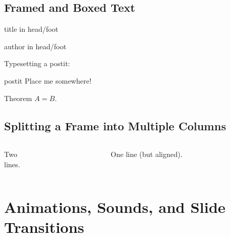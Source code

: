   \subsection{Framed and Boxed Text}
  \begin{frame}
  \begin{beamercolorbox}[ht=2.5ex,dp=1ex,center]{title in head/foot}
  \insertshorttitle
  \end{beamercolorbox}%
  \begin{beamercolorbox}[ht=2.5ex,dp=1ex,center]{author in head/foot}
  \insertshortauthor
  \end{beamercolorbox}
  \mbox{}\medskip\newline
  Typesetting a postit:\newline
  \begin{beamercolorbox}[sep=1em,wd=5cm]{postit}
  Place me somewhere!
  \end{beamercolorbox}
  \mbox{}\medskip\newline
  \begin{beamerboxesrounded}[upper=block head,lower=block body,shadow=true]{Theorem}
  $A = B$.
  \end{beamerboxesrounded}
  \end{frame}
  \subsection{Splitting a Frame into Multiple Columns}
  \begin{frame}
  \begin{columns}[t]
  \begin{column}{5cm}
  Two\\lines.
  \end{column}
  \begin{column}{5cm}
  One line (but aligned).
  \end{column}
  \end{columns}
  \end{frame}
  \section{Animations, Sounds, and Slide Transitions}
